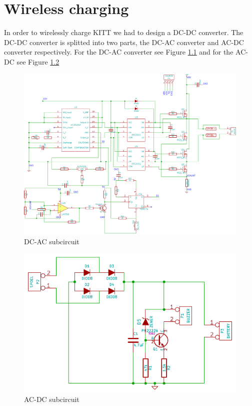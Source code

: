 \documentclass[final]{scrreprt} %
\begin{document}
\chapter{Wireless charging}
In order to wirelessly charge KITT we had to design a DC-DC converter. The DC-DC converter is splitted into two parts, the DC-AC converter and AC-DC converter respectively. 
For the DC-AC converter see Figure \ref{fig:DC-AC} and for the AC-DC see Figure \ref{fig:AC-DC}

\begin{figure}[h]
	\includegraphics[width=\linewidth]{resources/DC-AC-rc.pdf}
	\caption{DC-AC subcircuit}
	\label{fig:DC-AC}
\end{figure}

\begin{figure}[h]
	\includegraphics[width=\linewidth]{resources/AC-DC-rc.pdf}
	\caption{AC-DC subcircuit}
	\label{fig:AC-DC}
\end{figure}
\end{document}
